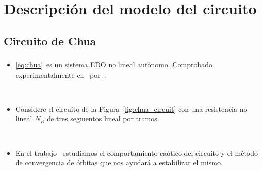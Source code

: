 \section{Descripción del modelo del circuito}

\subsection{Circuito de Chua}

\begin{frame}
	\frametitle{\subsecname}

	\begin{itemize}
		\item

		      \eqref{eq:chua}~es un sistema EDO no lineal autónomo.
		      Comprobado experimentalmente en~\citeyear{Zhong:M84/56}
		      por~.

		      \


		\item

		      Considere el circuito de la Figura~\ref{fig:chua_circuit}
		      con una \alert{resistencia no lineal $N_{R}$} de tres
		      segmentos lineal por tramos.

		      \

		\item

		      En el trabajo~ estudiamos el
		      comportamiento caótico del circuito y el
		      \alert{método de convergencia de órbitas} que nos ayudará
		      a estabilizar el mismo.
	\end{itemize}

	\


\end{frame}
